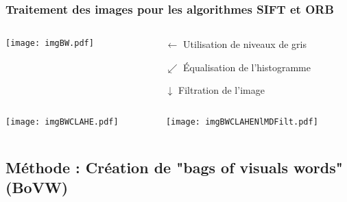 \documentclass[8pt,aspectratio=169,hyperref={unicode=true}]{beamer}
\begin{document}
\subsubsection{Traitement des images pour les algorithmes SIFT et ORB}
\begin{frame}{\insertsubsection}{\insertsubsubsection}
    \begin{columns}
        \begin{column}{.5\textwidth}
            \texttt{[image: imgBW.pdf]}
        \end{column}
        \begin{column}{.5\textwidth}
            \begin{itemize}
                \item[$\longleftarrow$] Utilisation de niveaux de gris
                \item[$\swarrow$] Équalisation de l'histogramme
                \item[$\downarrow$] Filtration de l'image
            \end{itemize}
        \end{column}
    \end{columns}
    \begin{columns}
        \begin{column}{.5\textwidth}
            \texttt{[image: imgBWCLAHE.pdf]}
        \end{column}
        \begin{column}{.5\textwidth}
            \texttt{[image: imgBWCLAHENlMDFilt.pdf]}
        \end{column}
    \end{columns}
\end{frame}

\subsection{Méthode : Création de "bags of visuals words" (BoVW)}
\end{document}
